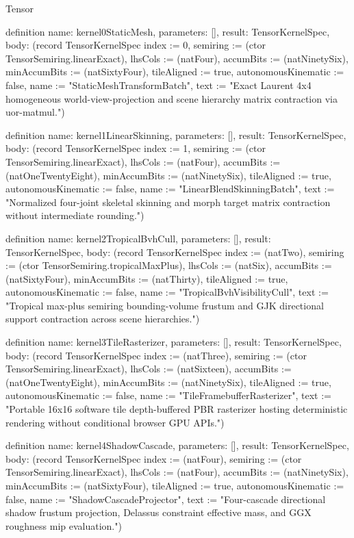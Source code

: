 \begin{lexlean}{Tensor}
\begin{semanticmodule}
definition{
  name: kernel0StaticMesh,
  parameters: [],
  result: TensorKernelSpec,
  body: (record TensorKernelSpec {index := 0, semiring := (ctor TensorSemiring.linearExact), lhsCols := (natFour), accumBits := (natNinetySix), minAccumBits := (natSixtyFour), tileAligned := true, autonomousKinematic := false, name := "StaticMeshTransformBatch", text := "Exact Laurent 4x4 homogeneous world-view-projection and scene hierarchy matrix contraction via uor-matmul."})
}

definition{
  name: kernel1LinearSkinning,
  parameters: [],
  result: TensorKernelSpec,
  body: (record TensorKernelSpec {index := 1, semiring := (ctor TensorSemiring.linearExact), lhsCols := (natFour), accumBits := (natOneTwentyEight), minAccumBits := (natNinetySix), tileAligned := true, autonomousKinematic := false, name := "LinearBlendSkinningBatch", text := "Normalized four-joint skeletal skinning and morph target matrix contraction without intermediate rounding."})
}

definition{
  name: kernel2TropicalBvhCull,
  parameters: [],
  result: TensorKernelSpec,
  body: (record TensorKernelSpec {index := (natTwo), semiring := (ctor TensorSemiring.tropicalMaxPlus), lhsCols := (natSix), accumBits := (natSixtyFour), minAccumBits := (natThirty), tileAligned := true, autonomousKinematic := false, name := "TropicalBvhVisibilityCull", text := "Tropical max-plus semiring bounding-volume frustum and GJK directional support contraction across scene hierarchies."})
}

definition{
  name: kernel3TileRasterizer,
  parameters: [],
  result: TensorKernelSpec,
  body: (record TensorKernelSpec {index := (natThree), semiring := (ctor TensorSemiring.linearExact), lhsCols := (natSixteen), accumBits := (natOneTwentyEight), minAccumBits := (natNinetySix), tileAligned := true, autonomousKinematic := false, name := "TileFramebufferRasterizer", text := "Portable 16x16 software tile depth-buffered PBR rasterizer hosting deterministic rendering without conditional browser GPU APIs."})
}

definition{
  name: kernel4ShadowCascade,
  parameters: [],
  result: TensorKernelSpec,
  body: (record TensorKernelSpec {index := (natFour), semiring := (ctor TensorSemiring.linearExact), lhsCols := (natFour), accumBits := (natNinetySix), minAccumBits := (natSixtyFour), tileAligned := true, autonomousKinematic := false, name := "ShadowCascadeProjector", text := "Four-cascade directional shadow frustum projection, Delassus constraint effective mass, and GGX roughness mip evaluation."})
}


\end{semanticmodule}
\end{lexlean}
